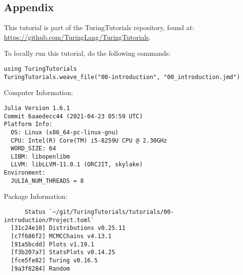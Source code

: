 \documentclass[12pt,a4paper]{article}
\begin{document}
\subsection{Appendix}
This tutorial is part of the TuringTutorials repository, found at: \href{https://github.com/TuringLang/TuringTutorials}{https://github.com/TuringLang/TuringTutorials}.


To locally run this tutorial, do the following commands:

\begin{verbatim}
using TuringTutorials
TuringTutorials.weave_file("00-introduction", "00_introduction.jmd")
\end{verbatim}

Computer Information:


\begin{verbatim}
Julia Version 1.6.1
Commit 6aaedecc44 (2021-04-23 05:59 UTC)
Platform Info:
  OS: Linux (x86_64-pc-linux-gnu)
  CPU: Intel(R) Core(TM) i5-8259U CPU @ 2.30GHz
  WORD_SIZE: 64
  LIBM: libopenlibm
  LLVM: libLLVM-11.0.1 (ORCJIT, skylake)
Environment:
  JULIA_NUM_THREADS = 8

\end{verbatim}

Package Information:


\begin{verbatim}
      Status `~/git/TuringTutorials/tutorials/00-introduction/Project.toml`
  [31c24e10] Distributions v0.25.11
  [c7f686f2] MCMCChains v4.13.1
  [91a5bcdd] Plots v1.19.1
  [f3b207a7] StatsPlots v0.14.25
  [fce5fe82] Turing v0.16.5
  [9a3f8284] Random

\end{verbatim}
\end{document}

